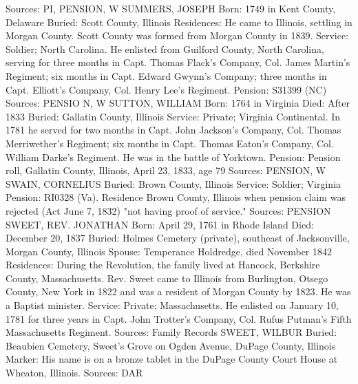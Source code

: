 Sources: PI, PENSION, W 
SUMMERS, JOSEPH
Born: 1749 in Kent County, Delaware
Buried: Scott County, Illinois 
Residences: He came to Illinois, settling in Morgan County. Scott County was formed from Morgan County in 1839. 
Service: Soldier; North Carolina. He enlisted from Guilford County, North Car­olina, serving for three months in Capt. Thomas Flack's Company, Col. James Martin's Regiment; six months in Capt. Edward Gwynn's Company; three months in Capt. Elliott's Company, Col. Henry Lee's Regiment. 
Pension: S31399 (NC) 
Sources: PENSIO N, W 
SUTTON, WILLIAM
Born: 1764 in Virginia 
Died: After 1833
Buried: Gallatin County, Illinois 
Service: Private; Virginia Continental. In 1781 he served for two months in Capt. John Jackson's Company, Col. Thomas Merriwether's Regiment; six months in Capt. Thomas Eaton's Company, Col. William Darke's Regiment. He was in the battle of Yorktown. 
Pension: Pension roll, Gallatin County, Illinois, April 23, 1833, age 79 
Sources: PENSION, W 
SWAIN, CORNELIUS
Buried: Brown County, Illinois
Service: Soldier; Virginia
Pension: RI0328 (Va). Residence Brown County, Illinois when pension claim was rejected (Act June 7, 1832) "not having proof of service." 
Sources: PENSION 
SWEET, REV. JONATHAN 
Born: April 29, 1761 in Rhode Island 
Died: December 20, 1837 
Buried: Holmes Cemetery (private), southeast of Jacksonville, Morgan County, Illinois
Spouse: Temperance Holdredge, died November 1842 
Residences: During the Revolution, the family lived at Hancock, Berkshire County, 
Massachusetts. Rev. Sweet came to Illinois from Burlington, Otsego County, New York in 1822 and was a resident of Morgan County by 1823. He was a Baptist minister. 
Service: Private; Massachusetts. He enlisted on January 10, 1781 for three years in Capt. John Trotter's Company, Col. Rufus Putman's Fifth Massachusetts Regiment. 
Sources: Family Records 
SWEET, WILBUR
Buried: Beaubien Cemetery, Sweet's Grove on Ogden Avenue, DuPage County, Illinois
Marker: His name is on a bronze tablet in the DuPage County Court House at Wheaton, Illinois.
Sources: DAR 

